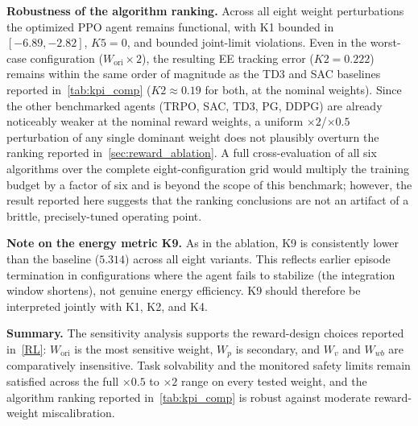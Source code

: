 \documentclass{ieeeaccess}
\newenvironment{roverlaphl}
  {\def\FrameCommand{\colorbox{roverlap}}\MakeFramed{\advance\hsize-\width\FrameRestore}}
  {\endMakeFramed}
\begin{document}
\begin{roverlaphl}
\noindent\textbf{Robustness of the algorithm ranking.} Across all eight weight perturbations the optimized PPO
agent remains functional, with K1 bounded in $[-6.89, -2.82]$, $K5=0$, and bounded joint-limit violations. Even
in the worst-case configuration ($W_{\mathrm{ori}}\times 2$), the resulting EE tracking error ($K2=0.222$) remains
within the same order of magnitude as the TD3 and SAC baselines reported in~\autoref{tab:kpi_comp} ($K2 \approx 0.19$
for both, at the nominal weights). Since the other benchmarked agents (TRPO, SAC, TD3, PG, DDPG) are already
noticeably weaker at the nominal reward weights, a uniform $\times 2$/$\times 0.5$ perturbation of any single
dominant weight does not plausibly overturn the ranking reported in~\autoref{sec:reward_ablation}. A full
cross-evaluation of all six algorithms over the complete eight-configuration grid would multiply the training
budget by a factor of six and is beyond the scope of this benchmark; however, the result reported here
suggests that the ranking conclusions are not an artifact of a brittle, precisely-tuned operating
point.

\noindent\textbf{Note on the energy metric K9.} As in the ablation, K9 is consistently lower than the baseline
($5.314$) across all eight variants. This reflects earlier episode termination in configurations where the agent
fails to stabilize (the integration window shortens), not genuine energy efficiency. K9 should therefore be
interpreted jointly with K1, K2, and K4.

\noindent\textbf{Summary.} The sensitivity analysis supports the reward-design choices reported in~\autoref{RL}:
$W_{\mathrm{ori}}$ is the most sensitive weight, $W_p$ is secondary, and $W_v$ and $W_{wb}$ are comparatively
insensitive. Task solvability and the monitored safety limits remain satisfied across the full $\times 0.5$ to $\times 2$
range on every tested weight, and the algorithm ranking reported in~\autoref{tab:kpi_comp} is robust against
moderate reward-weight miscalibration.
\end{roverlaphl}
\end{document}
